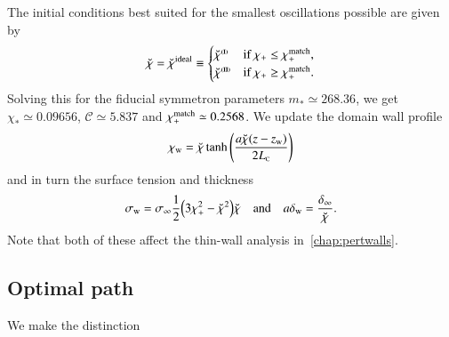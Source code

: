 The initial conditions best suited for the smallest oscillations possible are given by 
\begin{equation}\label{eq:stablesym:optimal_chi_breve}
    \breve{\chi} = \breve{\chi}^\mathrm{ideal}\equiv \begin{cases}
        \breve{\chi}^{\text{{\tiny{\textbf{(I)}}}}} &\text{if } \chi_+ \leq\chi_+^\mathrm{match}, \\
        \breve{\chi}^{\text{{\tiny{\textbf{(II)}}}}} &\text{if } \chi_+ \geq\chi_+^\mathrm{match}.
    \end{cases}
\end{equation}
Solving this for the fiducial symmetron parameters %
$m_\ast \simeq 268.36$, we get $\chi_\ast \simeq 0.09656$, $\mathcal{C}\simeq 5.837$ and $\chi_+^\mathrm{match}\simeq 0.2568$. We update the domain wall profile
\begin{equation}\label{eq:stablesym:chi_w_quasistatic_FLRW_updated}
    \chi_\mathrm{w} = \breve{\chi} \tanh{{\left(  \frac{a\breve{\chi}(z-z\ensuremath{_\mathrm{w}})}{2L_{\text{\tiny{C}}}}  \right)}}
\end{equation}
and in turn the surface tension and thickness
\begin{equation}
    \sigma_\mathrm{w} = \sigma_\infty \frac{1}{2} {\left(  3\chi_+^2- \breve{\chi}^2  \right)}\breve{\chi} \quad\text{and}\quad a\delta_\mathrm{w} = \frac{\delta_\infty}{\breve{\chi}} .
\end{equation}
Note that both of these affect the thin-wall analysis in~\cref{chap:pertwalls}.




\subsection{Optimal path}
    We make the distinction \blahblah

